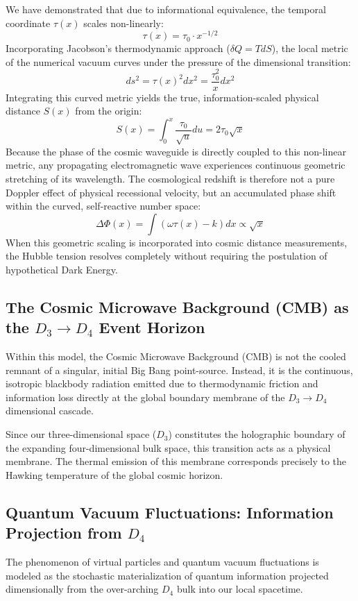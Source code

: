 \documentclass[11pt,a4paper]{article}
\theoremstyle{plain}
\theoremstyle{definition}
\theoremstyle{remark}
\begin{document}
We have demonstrated that due to informational equivalence, the temporal coordinate $\tau(x)$ scales non-linearly:
\begin{equation}
\tau(x) = \tau_0 \cdot x^{-1/2}
\end{equation}
Incorporating Jacobson's thermodynamic approach ($\delta Q = T dS$), the local metric of the numerical vacuum curves under the pressure of the dimensional transition:
\begin{equation}
ds^2 = \tau(x)^2 dx^2 = \frac{\tau_0^2}{x} dx^2
\end{equation}
Integrating this curved metric yields the true, information-scaled physical distance $S(x)$ from the origin:
\begin{equation}
S(x) = \int_0^x \frac{\tau_0}{\sqrt{u}} du = 2 \tau_0 \sqrt{x}
\end{equation}
Because the phase of the cosmic waveguide is directly coupled to this non-linear metric, any propagating electromagnetic wave experiences continuous geometric stretching of its wavelength. The cosmological redshift is therefore not a pure Doppler effect of physical recessional velocity, but an accumulated phase shift within the curved, self-reactive number space:
\begin{equation}
\Delta\Phi(x) = \int (\omega \tau(x) - k) dx \propto \sqrt{x}
\end{equation}
When this geometric scaling is incorporated into cosmic distance measurements, the Hubble tension resolves completely without requiring the postulation of hypothetical Dark Energy.

\subsection{The Cosmic Microwave Background (CMB) as the $D_3 \to D_4$ Event Horizon}
Within this model, the Cosmic Microwave Background (CMB) is not the cooled remnant of a singular, initial Big Bang point-source. Instead, it is the continuous, isotropic blackbody radiation emitted due to thermodynamic friction and information loss directly at the global boundary membrane of the $D_3 \to D_4$ dimensional cascade.

Since our three-dimensional space ($D_3$) constitutes the holographic boundary of the expanding four-dimensional bulk space, this transition acts as a physical membrane. The thermal emission of this membrane corresponds precisely to the Hawking temperature of the global cosmic horizon.

\subsection{Quantum Vacuum Fluctuations: Information Projection from $D_4$}
The phenomenon of virtual particles and quantum vacuum fluctuations is modeled as the stochastic materialization of quantum information projected dimensionally from the over-arching $D_4$ bulk into our local spacetime.
\end{document}
